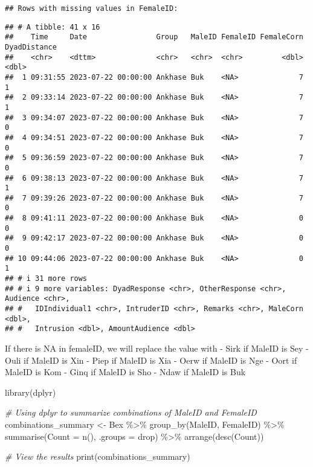\documentclass[
]{article}
\newenvironment{Shaded}{\begin{snugshade}}{\end{snugshade}}
\newcommand{\AttributeTok}[1]{\textcolor[rgb]{0.77,0.63,0.00}{#1}}
\newcommand{\CommentTok}[1]{\textcolor[rgb]{0.56,0.35,0.01}{\textit{#1}}}
\newcommand{\FunctionTok}[1]{\textcolor[rgb]{0.00,0.00,0.00}{#1}}
\newcommand{\NormalTok}[1]{#1}
\newcommand{\OtherTok}[1]{\textcolor[rgb]{0.56,0.35,0.01}{#1}}
\newcommand{\SpecialCharTok}[1]{\textcolor[rgb]{0.00,0.00,0.00}{#1}}
\newcommand{\StringTok}[1]{\textcolor[rgb]{0.31,0.60,0.02}{#1}}
\begin{document}
\begin{verbatim}
## Rows with missing values in FemaleID:
\end{verbatim}

\begin{verbatim}
## # A tibble: 41 x 16
##    Time     Date                Group   MaleID FemaleID FemaleCorn DyadDistance
##    <chr>    <dttm>              <chr>   <chr>  <chr>         <dbl>        <dbl>
##  1 09:31:55 2023-07-22 00:00:00 Ankhase Buk    <NA>              7            1
##  2 09:33:14 2023-07-22 00:00:00 Ankhase Buk    <NA>              7            1
##  3 09:34:07 2023-07-22 00:00:00 Ankhase Buk    <NA>              7            0
##  4 09:34:51 2023-07-22 00:00:00 Ankhase Buk    <NA>              7            0
##  5 09:36:59 2023-07-22 00:00:00 Ankhase Buk    <NA>              7            0
##  6 09:38:13 2023-07-22 00:00:00 Ankhase Buk    <NA>              7            1
##  7 09:39:26 2023-07-22 00:00:00 Ankhase Buk    <NA>              7            0
##  8 09:41:11 2023-07-22 00:00:00 Ankhase Buk    <NA>              0            0
##  9 09:42:17 2023-07-22 00:00:00 Ankhase Buk    <NA>              0            0
## 10 09:44:06 2023-07-22 00:00:00 Ankhase Buk    <NA>              0            1
## # i 31 more rows
## # i 9 more variables: DyadResponse <chr>, OtherResponse <chr>, Audience <chr>,
## #   IDIndividual1 <chr>, IntruderID <chr>, Remarks <chr>, MaleCorn <dbl>,
## #   Intrusion <dbl>, AmountAudience <dbl>
\end{verbatim}

If there is NA in femaleID, we will replace the value with - Sirk if
MaleID is Sey - Ouli if MaleID is Xin - Piep if MaleID is Xia - Oerw if
MaleID is Nge - Oort if MaleID is Kom - Ginq if MaleID is Sho - Ndaw if
MaleID is Buk

\begin{Shaded}
\begin{Highlighting}[]
\FunctionTok{library}\NormalTok{(dplyr)}

\CommentTok{\# Using dplyr to summarize combinations of MaleID and FemaleID}
\NormalTok{combinations\_summary }\OtherTok{\textless{}{-}}\NormalTok{ Bex }\SpecialCharTok{\%\textgreater{}\%}
  \FunctionTok{group\_by}\NormalTok{(MaleID, FemaleID) }\SpecialCharTok{\%\textgreater{}\%}
  \FunctionTok{summarise}\NormalTok{(}\AttributeTok{Count =} \FunctionTok{n}\NormalTok{(), }\AttributeTok{.groups =} \StringTok{\textquotesingle{}drop\textquotesingle{}}\NormalTok{) }\SpecialCharTok{\%\textgreater{}\%}
  \FunctionTok{arrange}\NormalTok{(}\FunctionTok{desc}\NormalTok{(Count))}

\CommentTok{\# View the results}
\FunctionTok{print}\NormalTok{(combinations\_summary)}
\end{Highlighting}
\end{Shaded}
\end{document}
